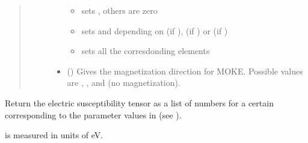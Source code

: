 \documentclass[letterpaper,10pt,english]{sphinxmanual}
\begin{document}
\begin{fulllineitems}
\begin{fulllineitems}
\begin{quote}
\begin{description}
\begin{itemize}
\begin{itemize}
\item {} 
 sets , others are zero

\item {} 
 sets   and depending on 
 (if ),  (if ) or  (if )

\item {} 
 sets all the corresdonding elements

\end{itemize}


\item {} 
 () \textendash{} Gives the magnetization direction for MOKE. Possible values are , ,  and  (no magnetization).

\end{itemize}

\end{description}\end{quote}

\end{fulllineitems}


\begin{fulllineitems}
\label{\detokenize{modules-api/samplerepresentation:SampleRepresentation.ModelChiLayerObject.getChi}}
Return the electric susceptibility tensor as a list of numbers for a certain  corresponding to the parameter values in  (see {\hyperref[\detokenize{modules-api/parameters:module-Parameters}]{}}).

 is measured in units of eV.

\end{fulllineitems}


\end{fulllineitems}
\end{document}
